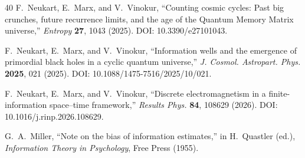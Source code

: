 ﻿\documentclass[12pt,a4paper]{article}
\begin{document}
\begin{thebibliography}{40}
F.~Neukart, E.~Marx, and V.~Vinokur,
``Counting cosmic cycles: Past big crunches, future recurrence limits, and the age of the Quantum Memory Matrix universe,''
\textit{Entropy} \textbf{27}, 1043 (2025).
DOI: 10.3390/e27101043.

F.~Neukart, E.~Marx, and V.~Vinokur,
``Information wells and the emergence of primordial black holes in a cyclic quantum universe,''
\textit{J. Cosmol. Astropart. Phys.} \textbf{2025}, 021 (2025).
DOI: 10.1088/1475-7516/2025/10/021.

F.~Neukart, E.~Marx, and V.~Vinokur,
``Discrete electromagnetism in a finite-information space--time framework,''
\textit{Results Phys.} \textbf{84}, 108629 (2026).
DOI: 10.1016/j.rinp.2026.108629.

G.~A.~Miller,
``Note on the bias of information estimates,''
in H.~Quastler (ed.), \textit{Information Theory in Psychology}, Free Press (1955).

\end{thebibliography}
\end{document}
